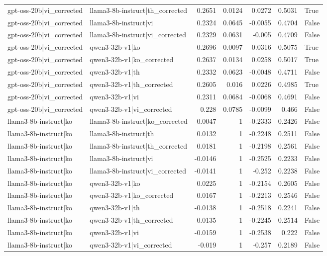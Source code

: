 \begin{table}
\begin{tabular}{l l r r r r l}
gpt-oss-20b|vi_corrected & llama3-8b-instruct|th_corrected & 0.2651 & 0.0124 & 0.0272 & 0.5031 & True \\
gpt-oss-20b|vi_corrected & llama3-8b-instruct|vi & 0.2324 & 0.0645 & -0.0055 & 0.4704 & False \\
gpt-oss-20b|vi_corrected & llama3-8b-instruct|vi_corrected & 0.2329 & 0.0631 & -0.005 & 0.4709 & False \\
gpt-oss-20b|vi_corrected & qwen3-32b-v1|ko & 0.2696 & 0.0097 & 0.0316 & 0.5075 & True \\
gpt-oss-20b|vi_corrected & qwen3-32b-v1|ko_corrected & 0.2637 & 0.0134 & 0.0258 & 0.5017 & True \\
gpt-oss-20b|vi_corrected & qwen3-32b-v1|th & 0.2332 & 0.0623 & -0.0048 & 0.4711 & False \\
gpt-oss-20b|vi_corrected & qwen3-32b-v1|th_corrected & 0.2605 & 0.016 & 0.0226 & 0.4985 & True \\
gpt-oss-20b|vi_corrected & qwen3-32b-v1|vi & 0.2311 & 0.0684 & -0.0068 & 0.4691 & False \\
gpt-oss-20b|vi_corrected & qwen3-32b-v1|vi_corrected & 0.228 & 0.0785 & -0.0099 & 0.466 & False \\
llama3-8b-instruct|ko & llama3-8b-instruct|ko_corrected & 0.0047 & 1 & -0.2333 & 0.2426 & False \\
llama3-8b-instruct|ko & llama3-8b-instruct|th & 0.0132 & 1 & -0.2248 & 0.2511 & False \\
llama3-8b-instruct|ko & llama3-8b-instruct|th_corrected & 0.0181 & 1 & -0.2198 & 0.2561 & False \\
llama3-8b-instruct|ko & llama3-8b-instruct|vi & -0.0146 & 1 & -0.2525 & 0.2233 & False \\
llama3-8b-instruct|ko & llama3-8b-instruct|vi_corrected & -0.0141 & 1 & -0.252 & 0.2238 & False \\
llama3-8b-instruct|ko & qwen3-32b-v1|ko & 0.0225 & 1 & -0.2154 & 0.2605 & False \\
llama3-8b-instruct|ko & qwen3-32b-v1|ko_corrected & 0.0167 & 1 & -0.2213 & 0.2546 & False \\
llama3-8b-instruct|ko & qwen3-32b-v1|th & -0.0138 & 1 & -0.2518 & 0.2241 & False \\
llama3-8b-instruct|ko & qwen3-32b-v1|th_corrected & 0.0135 & 1 & -0.2245 & 0.2514 & False \\
llama3-8b-instruct|ko & qwen3-32b-v1|vi & -0.0159 & 1 & -0.2538 & 0.222 & False \\
llama3-8b-instruct|ko & qwen3-32b-v1|vi_corrected & -0.019 & 1 & -0.257 & 0.2189 & False \\

\end{tabular}
\end{table}

